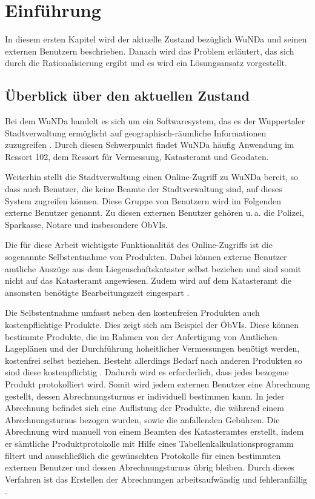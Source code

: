\chapter{Einführung}
In diesem ersten Kapitel wird der aktuelle Zustand bezüglich \acs{WuNDa} und seinen externen Benutzern beschrieben. Danach wird das Problem erläutert, das sich durch die Rationalisierung ergibt und es wird ein Lösungsansatz vorgestellt.

\section{Überblick über den aktuellen Zustand}
Bei dem \ac{WuNDa} handelt es sich um ein Softwaresystem, das es der Wuppertaler Stadtverwaltung ermöglicht auf geographisch-räumliche Informationen zuzugreifen \autocite[vgl.][]{cismet-wunda}. Durch diesen Schwerpunkt findet \ac{WuNDa} häufig Anwendung im Ressort 102, dem Ressort für Vermessung, Katasteramt und Geodaten.

Weiterhin stellt die Stadtverwaltung einen Online-Zugriff zu \ac{WuNDa} bereit, so dass auch Benutzer, die keine Beamte der Stadtverwaltung sind, auf dieses System zugreifen können. Diese Gruppe von Benutzern wird im Folgenden externe Benutzer genannt.
Zu diesen externen Benutzer gehören u.\,a. die Polizei, Sparkasse, Notare und insbesondere \acp{ÖbVI}.

Die für diese Arbeit wichtigste Funktionalität des Online-Zugriffs ist die sogenannte Selbstentnahme von Produkten.
Dabei können externe Benutzer amtliche Auszüge aus dem Liegenschaftskataster selbst beziehen und sind somit nicht auf das Katasteramt angewiesen.
Zudem wird auf dem Katasteramt die ansonsten benötigte Bearbeitungszeit eingespart \autocite[vgl.][]{wupp-wunda}.

Die Selbstentnahme umfasst neben den kostenfreien Produkten auch kostenpflichtige Produkte. 
Dies zeigt sich am Beispiel der \acp{ÖbVI}. Diese können bestimmte Produkte, die im Rahmen von der Anfertigung von Amtlichen Lageplänen und der Durchführung hoheitlicher Vermessungen benötigt werden, kostenfrei selbst beziehen.
Besteht allerdings Bedarf nach anderen Produkten so sind diese kostenpflichtig \autocite[vgl.][]{wupp-wunda-oebvi}.
Dadurch wird es erforderlich, dass jedes bezogene Produkt protokolliert wird.
Somit wird jedem externen Benutzer eine Abrechnung gestellt, dessen Abrechnungsturnus er individuell bestimmen kann.
In jeder Abrechnung befindet sich eine Auflistung der Produkte, die während einem Abrechnungsturnus bezogen wurden, sowie die anfallenden Gebühren.
Die Abrechnung wird manuell von einem Beamten des Katasteramtes erstellt, indem er sämtliche Produktprotokolle mit Hilfe eines Tabellenkalkulationsprogramm filtert und ausschließlich die gewünschten Protokolle für einen bestimmten externen Benutzer und dessen Abrechnungsturnus übrig bleiben.
Durch dieses Verfahren ist das Erstellen der Abrechnungen arbeitsaufwändig und fehleranfällig \autocite[vgl.][]{sander-abrechnung}.


